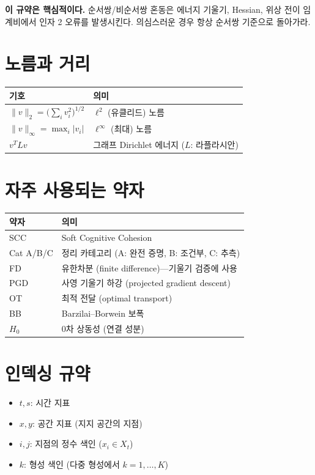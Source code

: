 \textbf{이 규약은 핵심적이다.} 순서쌍/비순서쌍 혼동은 에너지 기울기, Hessian, 위상 전이 임계비에서 인자 2 오류를 발생시킨다. 의심스러운 경우 항상 순서쌍 기준으로 돌아가라.


\section*{노름과 거리}

\begin{tabular}{lp{11cm}}
\hline
\textbf{기호} & \textbf{의미} \\
\hline
$\|v\|_2 = \big(\sum_i v_i^2\big)^{1/2}$ & $\ell^2$ (유클리드) 노름 \\
$\|v\|_\infty = \max_i |v_i|$ & $\ell^\infty$ (최대) 노름 \\
$v^T L v$ & 그래프 Dirichlet 에너지 ($L$: 라플라시안) \\
\hline
\end{tabular}


\section*{자주 사용되는 약자}

\begin{tabular}{lp{11cm}}
\hline
\textbf{약자} & \textbf{의미} \\
\hline
SCC & Soft Cognitive Cohesion \\
Cat A/B/C & 정리 카테고리 (A: 완전 증명, B: 조건부, C: 추측) \\
FD & 유한차분 (finite difference)---기울기 검증에 사용 \\
PGD & 사영 기울기 하강 (projected gradient descent) \\
OT & 최적 전달 (optimal transport) \\
BB & Barzilai--Borwein 보폭 \\
$H_0$ & 0차 상동성 (연결 성분) \\
\hline
\end{tabular}


\section*{인덱싱 규약}

\begin{itemize}
    \item $t, s$: 시간 지표
    \item $x, y$: 공간 지표 (지지 공간의 지점)
    \item $i, j$: 지점의 정수 색인 ($x_i \in X_t$)
    \item $k$: 형성 색인 (다중 형성에서 $k = 1, \ldots, K$)
\end{itemize}
